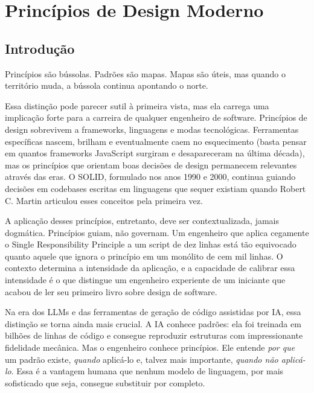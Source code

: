 \chapter{Princípios de Design Moderno}

\section{Introdução}

Princípios são bússolas. Padrões são mapas. Mapas são úteis, mas quando o
território muda, a bússola continua apontando o norte.

Essa distinção pode parecer sutil à primeira vista, mas ela carrega uma
implicação forte para a carreira de qualquer engenheiro de software.
Princípios de design sobrevivem a frameworks, linguagens e modas
tecnológicas. Ferramentas específicas nascem, brilham e eventualmente
caem no esquecimento (basta pensar em quantos frameworks JavaScript surgiram
e desapareceram na última década), mas os princípios que orientam boas decisões
de design permanecem relevantes através das eras. O SOLID, formulado nos anos
1990 e 2000, continua guiando decisões em codebases escritas em linguagens que
sequer existiam quando Robert C. Martin articulou esses conceitos pela
primeira vez.

A aplicação desses princípios, entretanto, deve ser contextualizada, jamais
dogmática. Princípios guiam, não governam. Um engenheiro que aplica
cegamente o Single Responsibility Principle a um script de dez linhas está
tão equivocado quanto aquele que ignora o princípio em um monólito de cem
mil linhas. O contexto determina a intensidade da aplicação, e a capacidade
de calibrar essa intensidade é o que distingue um engenheiro experiente de
um iniciante que acabou de ler seu primeiro livro sobre design de software.

Na era dos LLMs e das ferramentas de geração de código assistidas por IA,
essa distinção se torna ainda mais crucial. A IA conhece padrões: ela foi
treinada em bilhões de linhas de código e consegue reproduzir estruturas com
impressionante fidelidade mecânica. Mas o engenheiro conhece princípios. Ele
entende \emph{por que} um padrão existe, \emph{quando} aplicá-lo e, talvez
mais importante, \emph{quando não aplicá-lo}. Essa é a vantagem humana que
nenhum modelo de linguagem, por mais sofisticado que seja, consegue substituir
por completo.

